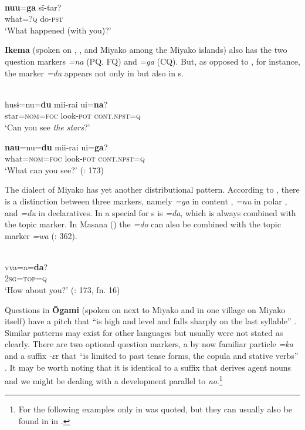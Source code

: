 \ea%
    \label{ex:japa:36}
    \\
    \gll \textbf{{nuu}}=\textbf{{ga}} sï-tar?\\
    what=?\textsc{q}  do-\textsc{pst}\\
    \glt ‘What happened (with you)?’ \citep[419]{Aoi2015}
    \z

\textbf{Ikema} (spoken on , , and Miyako among the Miyako islands) also has the two question markers \textit{=na} (PQ, FQ) and \textit{=ga} (CQ). But, as opposed to , for instance, the  marker \textit{=du} appears not only in  but also in s.

\ea%
    \label{ex:japa:37}
    \\
    \ea
    \gll husɨ=nu=\textbf{{du}} mii-rai    ui=\textbf{{na}}?\\
    star=\textsc{nom}=\textsc{foc}    look-\textsc{pot}  \textsc{cont.npst}=\textsc{q}\\
    \glt ‘Can you see \textit{the stars}?’
    
    \ex
    \gll \textbf{{nau}}=nu=\textbf{{du}} mii-rai    ui=\textbf{{ga}}?\\
    what=\textsc{nom}=\textsc{foc}  look-\textsc{pot}  \textsc{cont.npst=q}\\
    \glt ‘What can you see?’ (\citealt{HayashiY2010}: 173)
    \z
    \z

The  dialect of Miyako has yet another distributional pattern. According to \citet[620]{Koloskova2008}, there is a distinction between three  markers, namely \textit{=ga} in content , \textit{=nu} in polar , and \textit{=du} in declaratives. In  a special  for s is \textit{=da}, which is always combined with the topic marker. In Masana () the  \textit{=do} can also be combined with the topic marker \textit{=wa} (\citealt{vanderLubbeTokunaga2015}: 362).

\ea%
    \label{ex:japa:38}
    \\
    \gll vva=a=\textbf{{da}}?\\
    2\textsc{sg}=\textsc{top}=\textsc{q}\\
    \glt ‘How about you?’ (\citealt{HayashiY2010}: 173, fn. 16)
    \z

Questions in \textbf{Ōgami} (spoken on  next to Miyako and in one village on Miyako itself) have a pitch that “is high and level and falls sharply on the last syllable” \citep[146]{Pellard2010}. Similar patterns may exist for other  languages but usually were not stated as clearly. There are two optional question markers, a by now familiar particle \textit{=ka} and a suffix \textit{-ɛɛ} that “is limited to past tense forms, the copula and stative verbs” \citep[151]{Pellard2010}. It may be worth noting that it is identical to a suffix that derives agent nouns \citep[118]{Pellard2009} and we might be dealing with a development parallel to  \textit{no}.\footnote{For the following examples only \citet{Pellard2009} in  was quoted, but they can usually also be found in \citet{Pellard2010} in .}

